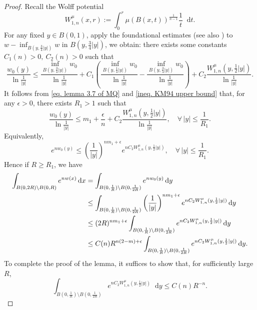\documentclass[12pt]{amsart}
\theoremstyle{plain}
\theoremstyle{definition}
\theoremstyle{remark}     %
\numberwithin{equation}{section}
\newcommand{\dd}{\mathop{}\!\mathrm{d}}%
\newcommand{\dx}{\mathop{}\!\mathrm{d}x}
\newcommand{\dy}{\mathop{}\!\mathrm{d}y}
\begin{document}
\begin{proof}
    Recall the Wolff potential
    \[
        W_{1,n}^{\mu}(x,r):=\int_0^r \mu(B(x,t))^{\frac{1}{n-1}}\frac{1}{t}\dd t.
    \]
    For any fixed $y\in B(0,1)$,  apply the foundational estimates \cite[Theorem 1.6]{KM94} (see also \cite[Theorem 2.6]{MQ}) to $w-\inf_{B(y,\frac{3}{4}|y|)}w$ in $B(y,\frac{3}{4}|y|)$, we obtain: there exists some constants $C_1(n)>0,\ C_2(n)>0$ such that
    \begin{equation}\label{ineq. KM94 upper bound}
        \frac{w_0(y)}{\ln\frac{1}{|y|}}\leq
        \frac{\inf_{B(y,\frac{3}{4}|y|)}w_0}{\ln\frac{1}{|y|}}
        +C_1 \left(
        \frac{\inf_{B(y,\frac{1}{4}|y|)}w_0}{\ln\frac{1}{|y|}}
        -\frac{\inf_{B(y,\frac{3}{4}|y|)}w_0}{\ln\frac{1}{|y|}}
        \right)
        +C_2\frac{W_{1,n}^{\mu}(y,\frac{1}{2}|y|)}{\ln\frac{1}{|y|}}.
    \end{equation}
    It follows from \cref{eq. lemma 3.7 of MQ} and \cref{ineq. KM94 upper bound} that, for any $\epsilon>0$, there exists $R_1>1$ such that
    \[
        \frac{w_0(y)}{\ln\frac{1}{|y|}}\leq
        m_1+\frac{\epsilon}{n}+C_2\frac{W_{1,n}^{\mu}(y,\frac{1}{2}|y|)}{\ln\frac{1}{|y|}},
        \quad \forall\, |y|\leq \frac{1}{R_1}.
    \]
    Equivalently,
    \[
        e^{nw_0(y)}\leq 
        \left(\frac{1}{|y|}\right)^{nm_1+\epsilon}
        e^{nC_2W_{1,n}^{\mu}(y,\frac{1}{2}|y|)},
        \quad \forall\, |y|\leq \frac{1}{R_1}.
    \]
Hence if $R\geq R_1$, we have
    \begin{align} \notag
        \int_{B(0,2R)\setminus B(0,R)}e^{nw(x)}\dx
        &=\int_{B(0,\frac{1}{R})\setminus B(0,\frac{1}{2R})}e^{nw_0(y)}\dy \\ \notag
        &\leq \int_{B(0,\frac{1}{R})\setminus B(0,\frac{1}{2R})}\left(\frac{1}{|y|}\right)^{nm_1+\epsilon}
        e^{nC_2W_{1,n}^{\mu}(y,\frac{1}{2}|y|)}\dy \notag\\
        &\leq (2R)^{nm_1+\epsilon}
        \int_{B(0,\frac{1}{R})\setminus B(0,\frac{1}{2R})} e^{nC_2W_{1,n}^{\mu}(y,\frac{1}{2}|y|)}\dy\notag\\
        &\leq C(n)R^{n(2-m)+\epsilon}\int_{B(0,\frac{1}{R})\setminus B(0,\frac{1}{2R})} e^{nC_2W_{1,n}^{\mu}(y,\frac{1}{2}|y|)}\dy. \label{ineq. integral of exp(n phi)}
    \end{align}
    To complete the proof of the lemma, it suffices to show that, for sufficiently large $R$,
    \begin{equation}\label{ineq. integral of Wolff potential}
        \int_{B(0,\frac{1}{R})\setminus B(0,\frac{1}{2R})} e^{nC_2W_{1,n}^{\mu}(y,\frac{1}{2}|y|)}\dy
        \leq C(n) R^{-n}.
    \end{equation}
    

\end{proof}
\end{document}
